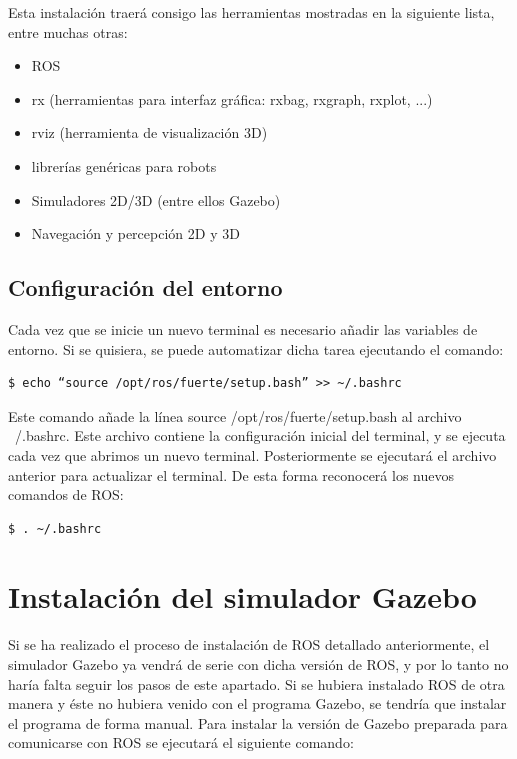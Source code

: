 \documentclass[12pt, a4paper]{report}
\begin{document}
Esta instalación traerá consigo las herramientas mostradas en la siguiente lista, entre muchas otras:

\begin{itemize}
\item ROS
\item rx (herramientas para interfaz gráfica: rxbag,  rxgraph, rxplot, ...)
\item rviz (herramienta de visualización 3D)
\item librerías genéricas para robots
\item Simuladores 2D/3D (entre ellos Gazebo)
\item Navegación y percepción 2D y 3D
\end{itemize}

\subsection{Configuración del entorno}

Cada vez que se inicie un nuevo terminal es necesario añadir las variables de entorno. Si se quisiera, se puede automatizar dicha tarea ejecutando el comando:

\begin{verbatim}
$ echo “source /opt/ros/fuerte/setup.bash” >> ~/.bashrc
\end{verbatim}

Este comando añade la línea source /opt/ros/fuerte/setup.bash al archivo ~/.bashrc. Este archivo contiene la configuración inicial del terminal, y se ejecuta cada vez que abrimos un nuevo terminal. Posteriormente se ejecutará el archivo anterior para actualizar el terminal. De esta forma reconocerá los nuevos comandos de ROS:

\begin{verbatim}
$ . ~/.bashrc
\end{verbatim}

\section{Instalación del simulador Gazebo}

Si se ha realizado el proceso de instalación de ROS detallado anteriormente, el simulador Gazebo ya vendrá de serie con dicha versión de ROS, y por lo tanto no haría falta seguir los pasos de este apartado. Si se hubiera instalado ROS de otra manera y éste no hubiera venido con el programa Gazebo, se tendría que instalar el programa de forma manual. Para instalar la versión de Gazebo preparada para comunicarse con ROS se ejecutará el siguiente comando:
\end{document}
